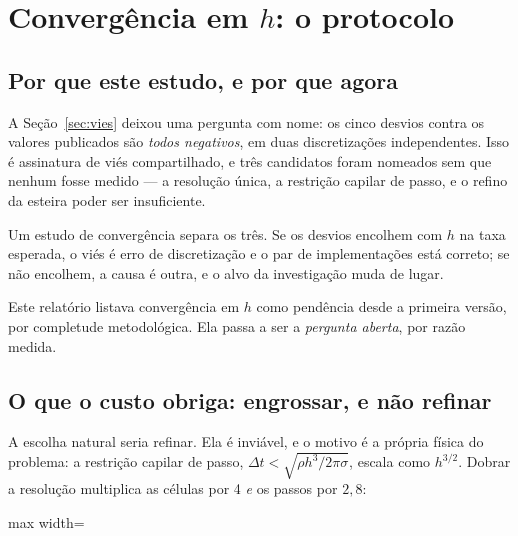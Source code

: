 \section{Converg\^encia em $h$: o protocolo}
\label{sec:convergencia}

\subsection{Por que este estudo, e por que agora}

A Se\c{c}\~ao~\ref{sec:vies} deixou uma pergunta com nome: os cinco desvios contra
os valores publicados s\~ao \emph{todos negativos}, em duas discretiza\c{c}\~oes
independentes. Isso \'e assinatura de vi\'es compartilhado, e tr\^es candidatos
foram nomeados sem que nenhum fosse medido --- a resolu\c{c}\~ao \'unica, a
restri\c{c}\~ao capilar de passo, e o refino da esteira poder ser insuficiente.

Um estudo de converg\^encia separa os tr\^es. Se os desvios encolhem com $h$ na
taxa esperada, o vi\'es \'e erro de discretiza\c{c}\~ao e o par de
implementa\c{c}\~oes est\'a correto; se n\~ao encolhem, a causa \'e outra, e o
alvo da investiga\c{c}\~ao muda de lugar.

Este relat\'orio listava converg\^encia em $h$ como pend\^encia desde a primeira
vers\~ao, por completude metodol\'ogica. Ela passa a ser a \emph{pergunta aberta},
por raz\~ao medida.

\subsection{O que o custo obriga: engrossar, e n\~ao refinar}

A escolha natural seria refinar. Ela \'e invi\'avel, e o motivo \'e a pr\'opria
f\'isica do problema: a restri\c{c}\~ao capilar de passo, $\Delta t <
\sqrt{\rho h^{3}/2\pi\sigma}$, escala como $h^{3/2}$. Dobrar a resolu\c{c}\~ao
multiplica as c\'elulas por 4 \emph{e} os passos por $2{,}8$:

\begin{adjustbox}{max width=\linewidth}
\end{adjustbox}

